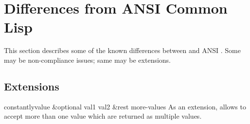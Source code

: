\section{Differences from ANSI Common Lisp}
This section describes some of the known differences between \cmucl{}
and ANSI \clisp{}.  Some may be non-compliance issues; same may be
extensions.

\subsection{Extensions}

\begin{defun}{}{constantly}{value \&optional val1 val2 \&rest
    more-values}
  As an extension, \cmucl{} allows  to accept more
  than one value which are returned as multiple values.
\end{defun}


